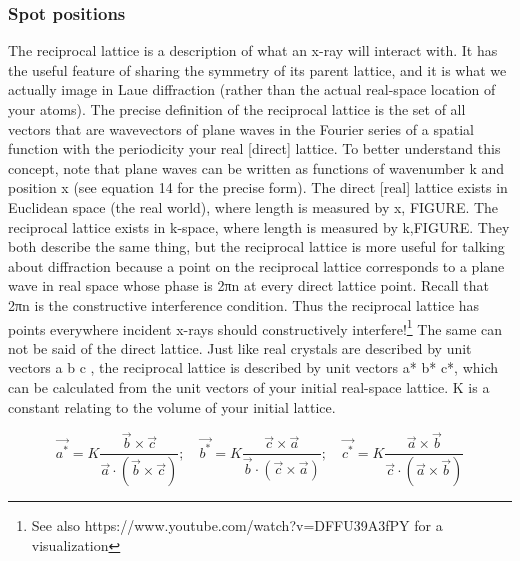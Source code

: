 \subsubsection{Spot positions}
The reciprocal lattice is a description of what an x-ray will interact with. It has the useful feature of sharing the symmetry of its parent lattice, and it is what we actually image in Laue diffraction (rather than the actual real-space location of your atoms). The precise definition of the reciprocal lattice is the set of all vectors that are wavevectors of plane waves in the Fourier series of a spatial function with the periodicity your real [direct] lattice.
To better understand this concept, note that plane waves can be written as functions of wavenumber k and position x (see equation 14 for the precise form). The direct [real] lattice exists in Euclidean space (the real world), where length is measured by x, FIGURE. The reciprocal lattice exists in k-space, where length is measured by k,FIGURE. They both describe the same thing, but the reciprocal lattice is more useful for talking about diffraction because a point on the reciprocal lattice corresponds to a plane wave in real space whose phase is 2πn at every direct lattice point. Recall that 2πn is the constructive interference condition. Thus the reciprocal lattice has points everywhere incident x-rays should constructively interfere!\footnote{See also https://www.youtube.com/watch?v=DFFU39A3fPY for a visualization} The same can not be said of the direct lattice.
Just like real crystals are described by unit vectors a b c , the reciprocal lattice is described by unit vectors a* b* c*, which can be calculated from the unit vectors of your initial real-space lattice. K is a constant relating to the volume of your initial lattice.

\begin{equation}
    \vec{a^*}=K\frac{\vec{b}\times\vec{c}}{\vec{a}\cdot(\vec{b}\times\vec{c})};\quad
    \vec{b^*}=K\frac{\vec{c}\times\vec{a}}{\vec{b}\cdot(\vec{c}\times\vec{a})};\quad
    \vec{c^*}=K\frac{\vec{a}\times\vec{b}}{\vec{c}\cdot(\vec{a}\times\vec{b})}
    \label{RecipLatVecs}
\end{equation}

